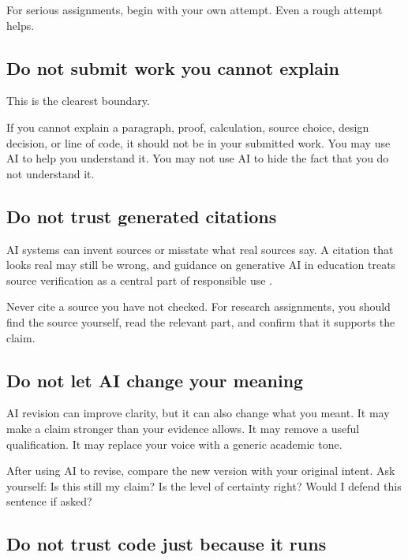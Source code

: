 \documentclass{SIAMbook2023}
\begin{document}
For serious assignments, begin with your own attempt. Even a rough attempt helps.

\subsection{Do not submit work you cannot explain}
\label{subsec:cannot-explain}

This is the clearest boundary.

If you cannot explain a paragraph, proof, calculation, source choice, design decision, or line of code, it should not be in your submitted work. You may use AI to help you understand it. You may not use AI to hide the fact that you do not understand it.

\subsection{Do not trust generated citations}
\label{subsec:citations}%
%

AI systems can invent sources or misstate what real sources say. A citation that looks real may still be wrong, and guidance on generative AI in education treats source verification as a central part of responsible use \citep{miao2023guidance}.

Never cite a source you have not checked. For research assignments, you should find the source yourself, read the relevant part, and confirm that it supports the claim.

\subsection{Do not let AI change your meaning}
\label{subsec:meaning-drift}

AI revision can improve clarity, but it can also change what you meant. It may make a claim stronger than your evidence allows. It may remove a useful qualification. It may replace your voice with a generic academic tone.

After using AI to revise, compare the new version with your original intent. Ask yourself: Is this still my claim? Is the level of certainty right? Would I defend this sentence if asked?

\subsection{Do not trust code just because it runs}
\label{subsec:code-runs}%
\end{document}
